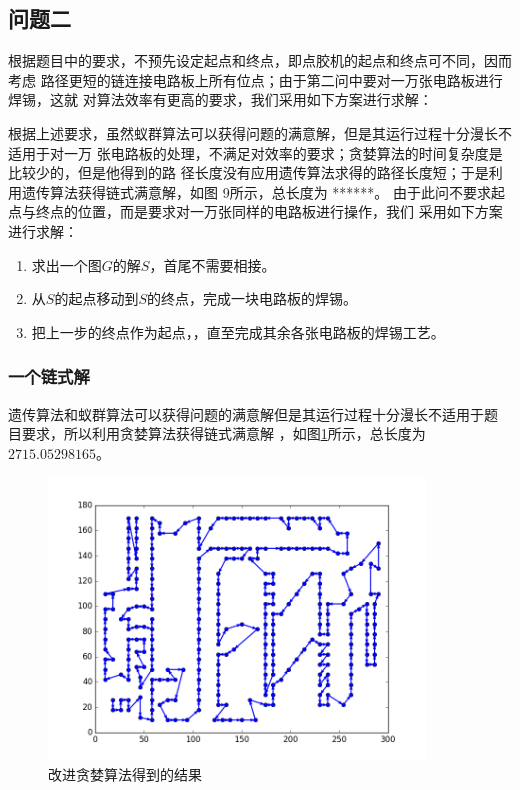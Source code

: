 \documentclass[fontset=windows,a4paper,12pt]{ctexart}
\begin{document}
    \subsection{问题二}
	  根据题目中的要求，不预先设定起点和终点，即点胶机的起点和终点可不同，因而考虑
	  路径更短的链连接电路板上所有位点；由于第二问中要对一万张电路板进行焊锡，这就
	  对算法效率有更高的要求，我们采用如下方案进行求解：

根据上述要求，虽然蚁群算法可以获得问题的满意解，但是其运行过程十分漫长不适用于对一万
张电路板的处理，不满足对效率的要求；贪婪算法的时间复杂度是比较少的，但是他得到的路
径长度没有应用遗传算法求得的路径长度短；于是利用遗传算法获得链式满意解，如图 9所示，总长度为 ******。
	  由于此问不要求起点与终点的位置，而是要求对一万张同样的电路板进行操作，我们
	  采用如下方案进行求解：
	  \begin{enumerate}
	  	\item 求出一个图$G$的解$S$，首尾不需要相接。
	  	\item 从$S$的起点移动到$S$的终点，完成一块电路板的焊锡。
	  	\item 把上一步的终点作为起点，，直至完成其余各张电路板的焊锡工艺。
	  \end{enumerate}
      \subsubsection{一个链式解}
        遗传算法和蚁群算法可以获得问题的满意解但是其运行过程十分漫长不适用于题
        目要求，所以利用贪婪算法获得链式满意解
        ，如图\ref{fig:greedy2}所示，总长度为$2715.05298165$。
        \begin{figure}[!htbp]
        	\centering
        	\includegraphics[width=10cm]{pic/greedy_result2.png}
        	\caption{改进贪婪算法得到的结果}
        	\label{fig:greedy2}
        \end{figure}
\end{document}
